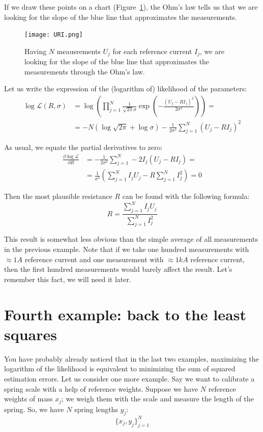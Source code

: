 \documentclass[notitlepage,oneside]{book}
\begin{document}
If we draw these points on a chart (Figure~\ref{fig:URI}), the Ohm's law tells us that we are looking for the slope of the blue line that approximates the measurements.
\begin{figure}[htb!]
\centering
\texttt{[image: URI.png]}
\caption{Having $N$ meausrements $U_j$ for each reference current $I_j$, we are looking for the slope of the blue line that approximates the measurements through the Ohm's law.}
\label{fig:URI}
\end{figure}


Let us write the expression of the (logarithm of) likelihood of the parameters:
\begin{align*}
\log \mathcal{L}(R,\sigma) & = \log \left(\prod\limits_{j=1}^N  \frac{1}{\sqrt{2\pi}\sigma} \exp\left(-\frac{(U_j-R I_j)^2}{2\sigma^2}\right)\right) =\\
& = -N \left(\log\sqrt{2\pi} + \log\sigma\right) - \frac{1}{2\sigma^2} \sum\limits_{j=1}^N (U_j- R I_j)^2
\end{align*}

As usual, we equate the partial derivatives to zero:
\begin{align*}
\frac{\partial\log\mathcal{L}}{\partial R} &=  -\frac{1}{2\sigma^2}\sum\limits_{j=1}^N -2I_j (U_j- R I_j) = \\
&= \frac{1}{\sigma^2}\left(\sum\limits_{j=1}^N I_jU_j - R\sum\limits_{j=1}^N I_j^2\right) = 0
\end{align*}

Then the most plausible resistance $R$ can be found with the following formula:
$$
R = \frac{\sum\limits_{j=1}^N I_jU_j}{\sum\limits_{j=1}^N I_j^2}
$$

This result is somewhat less obvious than the simple average of all measurements in the previous example.
Note that if we take one hundred measurements with $\approx 1A$ reference current and one measurement with $\approx 1kA$ reference current,
then the first hundred measurements would barely affect the result. Let's remember this fact, we will need it later.

\section{Fourth example: back to the least squares}
\label{sec:springscale}
You have probably already noticed that in the last two examples, maximizing the logarithm of the likelihood is equivalent to minimizing the sum of squared estimation errors.
Let us consider one more example.
Say we want to calibrate a spring scale with a help of reference weights.
Suppose we have $N$ reference weights of mass $x_j$; we weigh them with the scale and measure the length of the spring.
So, we have $N$ spring lengths $y_j$:
$$
\{x_j, y_j\}_{j=1}^{N}
$$
\end{document}
